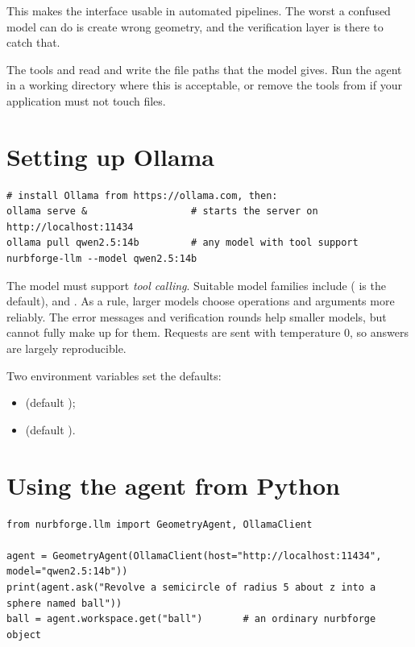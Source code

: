 This makes the interface usable in automated pipelines. The worst a confused model can do is
create wrong geometry, and the verification layer is there to catch that.

\begin{warning}
The tools  and  read and write the file paths that
the model gives. Run the agent in a working directory where this is acceptable, or remove the
tools from  if your application must not touch files.
\end{warning}

\section{Setting up Ollama}

\begin{lstlisting}[style=shell]
# install Ollama from https://ollama.com, then:
ollama serve &                  # starts the server on http://localhost:11434
ollama pull qwen2.5:14b         # any model with tool support
nurbforge-llm --model qwen2.5:14b
\end{lstlisting}

The model must support \emph{tool calling}. Suitable model families include 
( is the default),  and . As a rule, larger
models choose operations and arguments more reliably. The error messages and verification rounds
help smaller models, but cannot fully make up for them. Requests are sent with temperature 0,
so answers are largely reproducible.

Two environment variables set the defaults:
\begin{itemize}
  \item {} (default );
  \item {} (default ).
\end{itemize}

\section{Using the agent from Python}

\begin{lstlisting}[style=python]
from nurbforge.llm import GeometryAgent, OllamaClient

agent = GeometryAgent(OllamaClient(host="http://localhost:11434", model="qwen2.5:14b"))
print(agent.ask("Revolve a semicircle of radius 5 about z into a sphere named ball"))
ball = agent.workspace.get("ball")       # an ordinary nurbforge object
\end{lstlisting}

